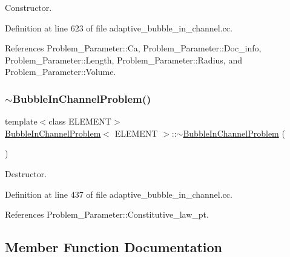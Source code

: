 Constructor. 



Definition at line 623 of file adaptive\+\_\+bubble\+\_\+in\+\_\+channel.\+cc.



References Problem\+\_\+\+Parameter\+::\+Ca, Problem\+\_\+\+Parameter\+::\+Doc\+\_\+info, Problem\+\_\+\+Parameter\+::\+Length, Problem\+\_\+\+Parameter\+::\+Radius, and Problem\+\_\+\+Parameter\+::\+Volume.

\mbox{\label{classBubbleInChannelProblem_a7a048a26898571d0f109df2a11f08eb7}} 
\subsubsection{\texorpdfstring{$\sim$\+Bubble\+In\+Channel\+Problem()}{~BubbleInChannelProblem()}}
{\footnotesize\ttfamily template$<$class E\+L\+E\+M\+E\+NT$>$ \\
\hyperlink{classBubbleInChannelProblem}{Bubble\+In\+Channel\+Problem}$<$ E\+L\+E\+M\+E\+NT $>$\+::$\sim$\hyperlink{classBubbleInChannelProblem}{Bubble\+In\+Channel\+Problem} (\begin{DoxyParamCaption}{ }\end{DoxyParamCaption})\hspace{0.3cm}{\ttfamily [inline]}}



Destructor. 



Definition at line 437 of file adaptive\+\_\+bubble\+\_\+in\+\_\+channel.\+cc.



References Problem\+\_\+\+Parameter\+::\+Constitutive\+\_\+law\+\_\+pt.



\subsection{Member Function Documentation}
\mbox{\label{classBubbleInChannelProblem_a67d2650bfca3775800784379938a35bc}} 
